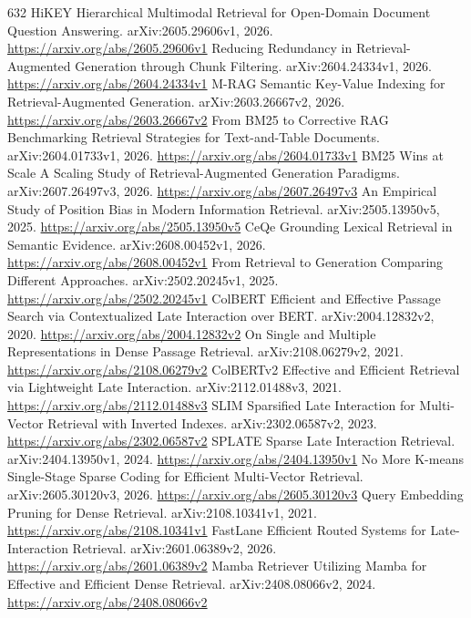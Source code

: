 \documentclass[11pt]{article}
\begin{document}
\begin{thebibliography}{632}
 HiKEY Hierarchical Multimodal Retrieval for Open-Domain Document Question Answering. arXiv:2605.29606v1, 2026. \url{https://arxiv.org/abs/2605.29606v1}
 Reducing Redundancy in Retrieval-Augmented Generation through Chunk Filtering. arXiv:2604.24334v1, 2026. \url{https://arxiv.org/abs/2604.24334v1}
 M-RAG Semantic Key-Value Indexing for Retrieval-Augmented Generation. arXiv:2603.26667v2, 2026. \url{https://arxiv.org/abs/2603.26667v2}
 From BM25 to Corrective RAG Benchmarking Retrieval Strategies for Text-and-Table Documents. arXiv:2604.01733v1, 2026. \url{https://arxiv.org/abs/2604.01733v1}
 BM25 Wins at Scale A Scaling Study of Retrieval-Augmented Generation Paradigms. arXiv:2607.26497v3, 2026. \url{https://arxiv.org/abs/2607.26497v3}
 An Empirical Study of Position Bias in Modern Information Retrieval. arXiv:2505.13950v5, 2025. \url{https://arxiv.org/abs/2505.13950v5}
 CeQe Grounding Lexical Retrieval in Semantic Evidence. arXiv:2608.00452v1, 2026. \url{https://arxiv.org/abs/2608.00452v1}
 From Retrieval to Generation Comparing Different Approaches. arXiv:2502.20245v1, 2025. \url{https://arxiv.org/abs/2502.20245v1}
 ColBERT Efficient and Effective Passage Search via Contextualized Late Interaction over BERT. arXiv:2004.12832v2, 2020. \url{https://arxiv.org/abs/2004.12832v2}
 On Single and Multiple Representations in Dense Passage Retrieval. arXiv:2108.06279v2, 2021. \url{https://arxiv.org/abs/2108.06279v2}
 ColBERTv2 Effective and Efficient Retrieval via Lightweight Late Interaction. arXiv:2112.01488v3, 2021. \url{https://arxiv.org/abs/2112.01488v3}
 SLIM Sparsified Late Interaction for Multi-Vector Retrieval with Inverted Indexes. arXiv:2302.06587v2, 2023. \url{https://arxiv.org/abs/2302.06587v2}
 SPLATE Sparse Late Interaction Retrieval. arXiv:2404.13950v1, 2024. \url{https://arxiv.org/abs/2404.13950v1}
 No More K-means Single-Stage Sparse Coding for Efficient Multi-Vector Retrieval. arXiv:2605.30120v3, 2026. \url{https://arxiv.org/abs/2605.30120v3}
 Query Embedding Pruning for Dense Retrieval. arXiv:2108.10341v1, 2021. \url{https://arxiv.org/abs/2108.10341v1}
 FastLane Efficient Routed Systems for Late-Interaction Retrieval. arXiv:2601.06389v2, 2026. \url{https://arxiv.org/abs/2601.06389v2}
 Mamba Retriever Utilizing Mamba for Effective and Efficient Dense Retrieval. arXiv:2408.08066v2, 2024. \url{https://arxiv.org/abs/2408.08066v2}

\end{thebibliography}
\end{document}
